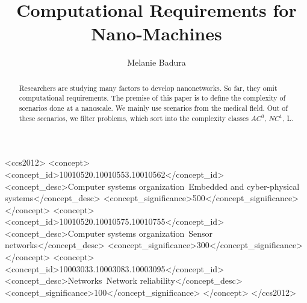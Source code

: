 \documentclass[10pt,sigconf]{acmart}
\begin{document}
\title{Computational Requirements for Nano-Machines}

\author{Melanie Badura}




\renewcommand{\shortauthors}{M. Badura et al.}


\begin{abstract}
Researchers are studying many factors to develop nanonetworks.
So far, they omit computational requirements.
The premise of this paper is to define the complexity of scenarios done at a nanoscale.
We mainly use scenarios from the medical field.
Out of these scenarios, we filter problems, which sort into the complexity classes $AC^0$, $NC^1$, L.
\end{abstract}

%
%
\begin{CCSXML}
<ccs2012>
 <concept>
  <concept_id>10010520.10010553.10010562</concept_id>
  <concept_desc>Computer systems organization~Embedded and cyber-physical systems</concept_desc>
  <concept_significance>500</concept_significance>
 </concept>
 <concept>
  <concept_id>10010520.10010575.10010755</concept_id>
  <concept_desc>Computer systems organization~Sensor networks</concept_desc>
  <concept_significance>300</concept_significance>
 </concept>
 <concept>
  <concept_id>10003033.10003083.10003095</concept_id>
  <concept_desc>Networks~Network reliability</concept_desc>
  <concept_significance>100</concept_significance>
 </concept>
</ccs2012>  
\end{CCSXML}






\maketitle
\end{document}
